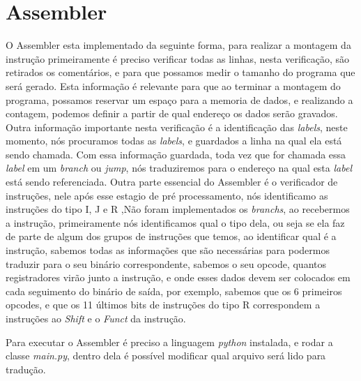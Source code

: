 \documentclass{report}
\begin{document}
  
  \section{Assembler}
  
  O Assembler esta implementado da seguinte forma, para realizar a montagem da instrução primeiramente é preciso verificar todas as linhas, nesta verificação, são retirados os comentários, e para que possamos medir o tamanho do programa que será gerado. Esta informação é relevante para que ao terminar a montagem do programa, possamos reservar um espaço para a memoria de dados, e realizando a contagem, podemos definir a partir de qual endereço os dados serão gravados. \\
    Outra informação importante nesta verificação é a identificação das \textit{labels}, neste momento, nós procuramos todas as \textit{labels}, e guardados a linha na qual ela está sendo chamada. Com essa informação guardada, toda vez que for chamada essa \textit{label} em um \textit{branch} ou \textit{jump}, nós traduziremos para o endereço na qual esta \textit{label} está sendo referenciada.
    Outra parte essencial do Assembler é o verificador de instruções, nele após esse estagio de pré processamento, nós identificamo as instruções do tipo I, J e R ,Não foram implementados os \textit{branchs}, ao recebermos a instrução, primeiramente nós identificamos qual o tipo dela, ou seja se ela faz de parte de algum dos grupos de instruções que temos, ao identificar qual é a instrução, sabemos todas as informações que são necessárias para podermos traduzir para o seu binário correspondente, sabemos o seu opcode, quantos registradores virão junto a instrução, e onde esses dados devem ser colocados em cada seguimento do binário de saída, por exemplo, sabemos que os 6 primeiros opcodes, e que os 11 últimos bits de instruções do tipo R correspondem a instruções ao \textit{Shift} e o \textit{Funct} da instrução.
    
    Para executar o Assembler é preciso a linguagem \textit{python} instalada, e rodar a classe \textit{main.py}, dentro dela é possível modificar qual arquivo será lido para tradução.
    
  

% 
% 
\end{document}
